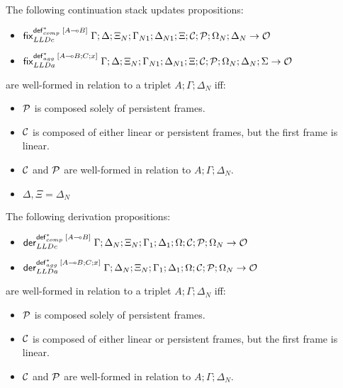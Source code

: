 \begin{definition}
The following continuation stack updates propositions:
\begin{itemize}[leftmargin=*]
   \item $\mathsf{fix}_{LLDc}^{\mathsf{def}_{comp}^{*} \; [A \multimap B]} \; \Gamma; \Delta; \Xi_N; \Gamma_{N1}; \Delta_{N1}; \Xi; \mathcal{C}; \mathcal{P}; \Omega_N;
      \Delta_N \rightarrow \mathcal{O}$
   \item $\mathsf{fix}_{LLDa}^{\mathsf{def}_{agg}^{*} \; [A \multimap B ; C; x]} \; \Gamma; \Delta; \Xi_N; \Gamma_{N1}; \Delta_{N1}; \Xi; \mathcal{C}; \mathcal{P}; \Omega_N;
      \Delta_N; \Sigma \rightarrow \mathcal{O}$
\end{itemize}
are well-formed in relation to a triplet $A; \Gamma; \Delta_{N}$ iff:

\begin{itemize}[leftmargin=*]
   \item $\mathcal{P}$ is composed solely of persistent frames.
   \item $\mathcal{C}$ is composed of either linear or persistent frames, but the first
   frame is linear.
   \item $\mathcal{C}$ and $\mathcal{P}$ are well-formed in relation to $A; \Gamma; \Delta_{N}$.
   \item $\Delta, \Xi = \Delta_{N}$
\end{itemize}
\end{definition}

\begin{definition}
The following derivation propositions:
\begin{itemize}[leftmargin=*]
   \item $\mathsf{der}_{LLDc}^{\mathsf{def}_{comp}^{*} \; [A \multimap B]} \; \Gamma; \Delta_N; \Xi_N; \Gamma_1; \Delta_1;
      \Omega; \mathcal{C}; \mathcal{P}; \Omega_N \rightarrow \mathcal{O}$
   \item $\mathsf{der}_{LLDa}^{\mathsf{def}_{agg}^{*} \; [A \multimap B ; C; x]} \; \Gamma; \Delta_N; \Xi_N; \Gamma_1; \Delta_1;
      \Omega; \mathcal{C}; \mathcal{P}; \Omega_N \rightarrow \mathcal{O}$
\end{itemize}
are well-formed in relation to a triplet $A; \Gamma; \Delta_{N}$ iff:

\begin{itemize}[leftmargin=*]
   \item $\mathcal{P}$ is composed solely of persistent frames.
   \item $\mathcal{C}$ is composed of either linear or persistent frames, but the first
   frame is linear.
   \item $\mathcal{C}$ and $\mathcal{P}$ are well-formed in relation to $A; \Gamma; \Delta_{N}$.
\end{itemize}

\end{definition}

